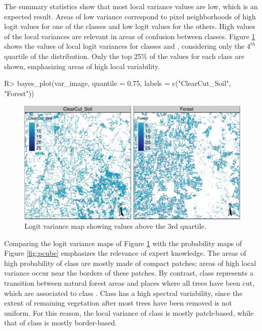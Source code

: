 \documentclass[
  shortnames]{jss}
\begin{document}
The summary statistics show that most local variance values are low, which is an expected result. Areas of low variance correspond to pixel neighborhoods of high logit values for one of the classes and low logit values for the others. High values of the local variances are relevant in areas of confusion between classes. Figure \ref{fig:vcube} shows the values of local logit variances for classes  and , considering only the \(4^{th}\) quartile of the distribution. Only the top 25\% of the values for each class are shown, emphasizing areas of high local variability.

\begin{CodeChunk}
\begin{CodeInput}
R> bayes_plot(var_image, quantile = 0.75, labels = c("ClearCut_Soil", "Forest"))
\end{CodeInput}
\begin{figure}[h]

{\centering \includegraphics{Bayesian_smoothing_JSS_files/figure-latex/vcube-1} 

}

\caption[Logit variance map showing values above the 3rd quartile]{Logit variance map showing values above the 3rd quartile.}\label{fig:vcube}
\end{figure}
\end{CodeChunk}

Comparing the logit variance maps of Figure \ref{fig:vcube} with the probability maps of Figure \ref{fig:pcube} emphasizes the relevance of expert knowledge. The areas of high probability of class  are mostly made of compact patches; areas of high local variance occur near the borders of these patches. By contrast, class  represents a transition between natural forest areas and places where all trees have been cut, which are associated to class . Class  has a high spectral variability, since the extent of remaining vegetation after most trees have been removed is not uniform. For this reason, the local variance of class  is mostly patch-based, while that of class  is mostly border-based.
\end{document}
